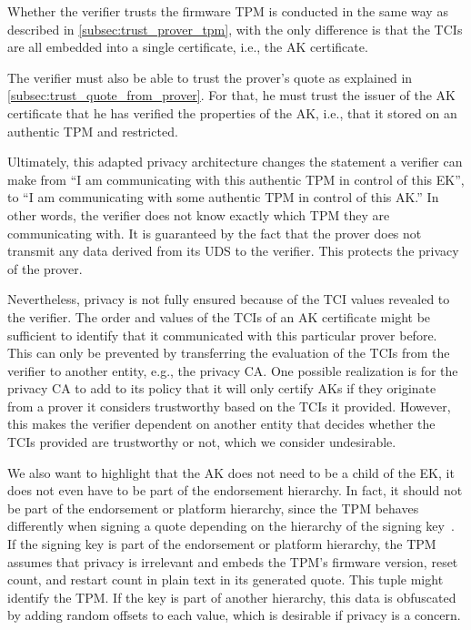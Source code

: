 Whether the verifier trusts the firmware TPM is conducted in the same way as described in \autoref{subsec:trust_prover_tpm}, with the only difference is that the TCIs are all embedded into a single certificate, i.e., the AK certificate.

The verifier must also be able to trust the prover's quote as explained in \autoref{subsec:trust_quote_from_prover}.
For that, he must trust the issuer of the AK certificate that he has verified the properties of the AK, i.e., that it stored on an authentic TPM and restricted.

Ultimately, this adapted privacy architecture changes the statement a verifier can make from ``I am communicating with this authentic TPM in control of this EK'', to ``I am communicating with some authentic TPM in control of this AK.''
In other words, the verifier does not know exactly which TPM they are communicating with.
It is guaranteed by the fact that the prover does not transmit any data derived from its UDS to the verifier.
This protects the privacy of the prover.

Nevertheless, privacy is not fully ensured because of the TCI values revealed to the verifier.
The order and values of the TCIs of an AK certificate might be sufficient to identify that it communicated with this particular prover before.
This can only be prevented by transferring the evaluation of the TCIs from the verifier to another entity, e.g., the privacy CA\@.
One possible realization is for the privacy CA to add to its policy that it will only certify AKs if they originate from a prover it considers trustworthy based on the TCIs it provided.
However, this makes the verifier dependent on another entity that decides whether the TCIs provided are trustworthy or not, which we consider undesirable.

We also want to highlight that the AK does not need to be a child of the EK, it does not even have to be part of the endorsement hierarchy.
In fact, it should not be part of the endorsement or platform hierarchy, since the TPM behaves differently when signing a quote depending on the hierarchy of the signing key~\cite{tpm}.
If the signing key is part of the endorsement or platform hierarchy, the TPM assumes that privacy is irrelevant and embeds the TPM's firmware version, reset count, and restart count in plain text in its generated quote.
This tuple might identify the TPM\@.
If the key is part of another hierarchy, this data is obfuscated by adding random offsets to each value, which is desirable if privacy is a concern.

